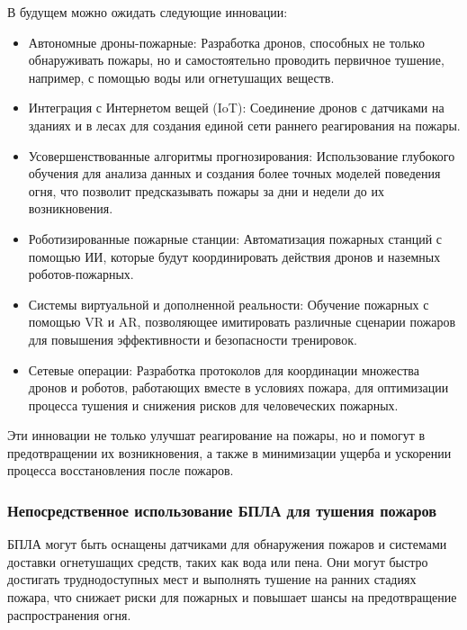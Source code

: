 В будущем можно ожидать следующие инновации:
\begin{itemize}
	\item Автономные дроны-пожарные: Разработка дронов, способных не только обнаруживать пожары, но и самостоятельно проводить первичное тушение, например, с помощью воды или огнетушащих веществ.
	\item Интеграция с Интернетом вещей (IoT): Соединение дронов с датчиками на зданиях и в лесах для создания единой сети раннего реагирования на пожары.
	\item Усовершенствованные алгоритмы прогнозирования: Использование глубокого обучения для анализа данных и создания более точных моделей поведения огня, что позволит предсказывать пожары за дни и недели до их возникновения.
	\item Роботизированные пожарные станции: Автоматизация пожарных станций с помощью ИИ, которые будут координировать действия дронов и наземных роботов-пожарных.
	\item Системы виртуальной и дополненной реальности: Обучение пожарных с помощью VR и AR, позволяющее имитировать различные сценарии пожаров для повышения эффективности и безопасности тренировок.
	\item Сетевые операции: Разработка протоколов для координации множества дронов и роботов, работающих вместе в условиях пожара, для оптимизации процесса тушения и снижения рисков для человеческих пожарных.
\end{itemize}

Эти инновации не только улучшат реагирование на пожары, но и помогут в предотвращении их возникновения, а также в минимизации ущерба и ускорении процесса восстановления после пожаров.
\subsubsection{Непосредственное использование БПЛА для тушения пожаров}

БПЛА могут быть оснащены датчиками для обнаружения пожаров и системами доставки огнетушащих средств, таких как вода или пена. Они могут быстро достигать труднодоступных мест и выполнять тушение на ранних стадиях пожара, что снижает риски для пожарных и повышает шансы на предотвращение распространения огня.

